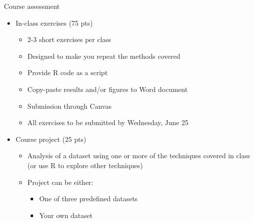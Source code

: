 \documentclass[aspectratio=169]{beamer}\usepackage[]{graphicx}\usepackage[]{color}
\begin{document}

\begin{frame}{Course assessment}
\begin{itemize}
  \item In-class exercises (75 pts)
  \begin{itemize}
    \item 2-3 short exercises per class
    \item Designed to make you repeat the methods covered
    \item Provide R code as a script
    \item Copy-paste results and/or figures to Word document
    \item Submission through Canvas
    \item All exercises to be submitted by Wednesday, June 25
  \end{itemize}
  \item<2-> Course project (25 pts)
  \begin{itemize}
    \item Analysis of a dataset using one or more of the techniques covered in class (or use R to explore other techniques)
    \item Project can be either:
  	\begin{itemize}
  		\item One of three predefined datasets
  		\item Your own dataset
  	\end{itemize}
  \end{itemize}
\end{itemize}
\end{frame}
\end{document}
